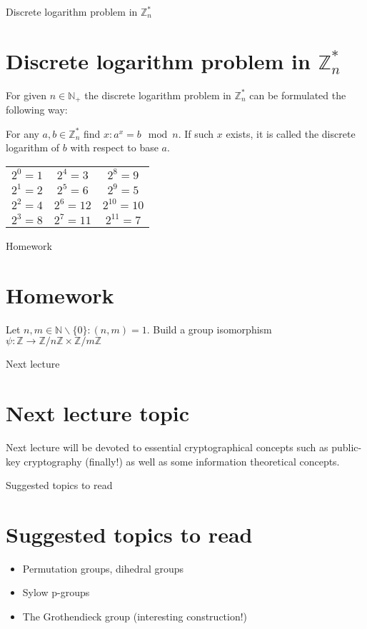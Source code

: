 \documentclass{beamer}
\begin{document}
\begin{frame}{Discrete logarithm problem in $\mathbb{Z}^*_n$}
	\section{Discrete logarithm problem in $\mathbb{Z}^*_n$}
	\begin{block}{}
		For given $n \in \mathbb{N}_+$ the discrete logarithm problem in $\mathbb{Z}^*_n$ can be formulated the 
		following way:
	\end{block}
	
	\begin{block}{}
		For any $a, b \in \mathbb{Z}^*_n$ find $x : a^x = b \mod n$. If such $x$ exists, it is called the discrete 
		logarithm of $b$ with respect to base $a$.
	\end{block}
	
	\begin{example}
		\begin{tabular}{>{\small}c>{\small}c>{\small}c}
			$2^0 = 1$ & $2^4 = 3$ & $2^8 = 9$ \\
			$2^1 = 2$ & $2^5 = 6$ & $2^9 = 5$ \\
			$2^2 = 4$ & $2^6 = 12$ & $2^{10} = 10$ \\
			$2^3 = 8$ & $2^7 = 11$ & $2^{11} = 7$
		\end{tabular}
	\end{example}
\end{frame}

\begin{frame}{Homework}
    \section{Homework}
	Let $n, m \in \mathbb{N} \backslash \{0\} : (n, m) = 1$. \newline
	Build a group isomorphism 
	$\psi : \mathbb{Z} \to \mathbb{Z} / n \mathbb{Z} \times \mathbb{Z} / m \mathbb{Z}$
\end{frame}

\begin{frame}{Next lecture}
    \section{Next lecture topic}
	Next lecture will be devoted to essential cryptographical concepts such as public-key cryptography (finally!) as 
	well as some information theoretical concepts. 
\end{frame}

\begin{frame}{Suggested topics to read}
    \section{Suggested topics to read}
    \begin{itemize}
		\item Permutation groups, dihedral groups
		\item Sylow p-groups
		\item The Grothendieck group (interesting construction!)
	\end{itemize}    
\end{frame}
\end{document}
